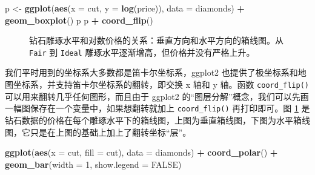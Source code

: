 \documentclass[
  b5paper,
  UTF8,twoside]{book}
\newenvironment{Shaded}{\begin{snugshade}}{\end{snugshade}}
\newcommand{\AttributeTok}[1]{\textcolor[rgb]{0.13,0.29,0.53}{#1}}
\newcommand{\ConstantTok}[1]{\textcolor[rgb]{0.56,0.35,0.01}{#1}}
\newcommand{\DecValTok}[1]{\textcolor[rgb]{0.00,0.00,0.81}{#1}}
\newcommand{\FunctionTok}[1]{\textcolor[rgb]{0.13,0.29,0.53}{\textbf{#1}}}
\newcommand{\NormalTok}[1]{#1}
\newcommand{\OtherTok}[1]{\textcolor[rgb]{0.56,0.35,0.01}{#1}}
\newcommand{\SpecialCharTok}[1]{\textcolor[rgb]{0.81,0.36,0.00}{\textbf{#1}}}
\begin{document}
\begin{Shaded}
\begin{Highlighting}[]
\NormalTok{p }\OtherTok{\textless{}{-}} \FunctionTok{ggplot}\NormalTok{(}\FunctionTok{aes}\NormalTok{(}\AttributeTok{x =}\NormalTok{ cut, }\AttributeTok{y =} \FunctionTok{log}\NormalTok{(price)), }\AttributeTok{data =}\NormalTok{ diamonds) }\SpecialCharTok{+}
  \FunctionTok{geom\_boxplot}\NormalTok{()}
\NormalTok{p}
\NormalTok{p }\SpecialCharTok{+} \FunctionTok{coord\_flip}\NormalTok{()}
\end{Highlighting}
\end{Shaded}

\begin{figure}

{\centering {}\newline{}\newline

}

\caption[钻石雕琢水平和对数价格的关系]{钻石雕琢水平和对数价格的关系：垂直方向和水平方向的箱线图。从 \texttt{Fair} 到 \texttt{Ideal} 雕琢水平逐渐增高，但价格并没有严格上升。}\label{fig:diamonds-cut}
\end{figure}





我们平时用到的坐标系大多数都是笛卡尔坐标系，ggplot2 也提供了极坐标系和地图坐标系，并支持笛卡尔坐标系的翻转，即交换 x 轴和 y 轴。函数 \texttt{coord\_flip()} 可以用来翻转几乎任何图形，而且由于 ggplot2 的``图层分解''概念，我们可以先画一幅图保存在一个变量中，如果想翻转就加上 \texttt{coord\_flip()} 再打印即可。图 \ref{fig:diamonds-cut} 是钻石数据的价格在每个雕琢水平下的箱线图，上图为垂直箱线图，下图为水平箱线图，它只是在上图的基础上加上了翻转坐标``层''。

\begin{Shaded}
\begin{Highlighting}[]
\FunctionTok{ggplot}\NormalTok{(}\FunctionTok{aes}\NormalTok{(}\AttributeTok{x =}\NormalTok{ cut, }\AttributeTok{fill =}\NormalTok{ cut), }\AttributeTok{data =}\NormalTok{ diamonds) }\SpecialCharTok{+}
  \FunctionTok{coord\_polar}\NormalTok{() }\SpecialCharTok{+}
  \FunctionTok{geom\_bar}\NormalTok{(}\AttributeTok{width =} \DecValTok{1}\NormalTok{, }\AttributeTok{show.legend =} \ConstantTok{FALSE}\NormalTok{)}
\end{Highlighting}
\end{Shaded}
\end{document}
